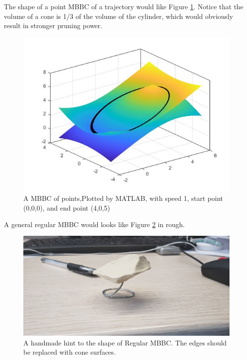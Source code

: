 \documentclass[sigplan]{acmart}
\begin{document}
The shape of a point MBBC of a trajectory would like Figure \ref{fig:matlab}. Notice that the volume of a cone is 1/3 of the volume of the cylinder, which would obviously result in stronger pruning power. \\
\begin{figure}[ht]
  \centering
  \includegraphics[width=\linewidth]{matlab.jpg}
  \caption{A MBBC of points,Plotted by MATLAB, with speed 1, start point (0,0,0), and end point (4,0,5)}
  \label{fig:matlab}
\end{figure}

A general regular MBBC would looks like Figure \ref{fig:generalmbbc} in rough.
\begin{figure}[ht]
  \centering
  \includegraphics[width=\linewidth]{generalmbbc.jpg}
  \caption{A handmade hint to the shape of Regular MBBC. The edges should be replaced with cone surfaces.}
  \label{fig:generalmbbc}
\end{figure}
\end{document}
